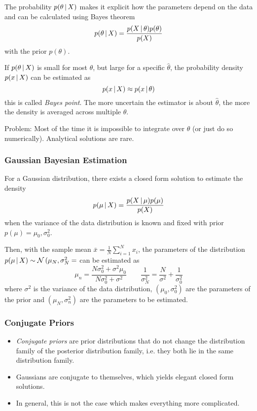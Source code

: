 		The probability \( p(\theta \,\vert\, X) \) makes it explicit how the parameters depend on the data and can be calculated using Bayes theorem
		\begin{equation}
			p(\theta \,\vert\, X) = \frac{p(X \,\vert\, \theta) p(\theta)}{p(X)}
		\end{equation}
		with the prior \( p(\theta) \).

		If \( p(\theta \,\vert\, X) \) is small for most \(\theta\), but large for a specific \( \hat{\theta} \), the probability density \( p(x \,\vert\, X) \) can be estimated as
		\begin{equation}
			p(x \,\vert\, X) \approx p(x \,\vert\, \theta)
		\end{equation}
		this is called \emph{Bayes point}. The more uncertain the estimator is about \( \hat{\theta} \), the more the density is averaged across multiple \(\theta\).

		Problem: Most of the time it is impossible to integrate over \(\theta\) (or just do so numerically). Analytical solutions are rare.

		\subsubsection{Gaussian Bayesian Estimation}
			For a Gaussian distribution, there exists a closed form solution to estimate the density
			\begin{equation}
				p(\mu \,\vert\, X) = \frac{p(X \,\vert\, \mu) p(\mu)}{p(X)}
			\end{equation}
			when the variance of the data distribution is known and fixed with prior \( p(\mu) = \mathcal{\mu_0, \sigma_0^2} \).

			Then, with the sample mean \( \bar{x} = \frac{1}{N} \sum_{i = 1}^{N} x_i \), the parameters of the distribution \( p(\mu \,\vert\, X) \sim \mathcal{N}\,(\mu_N, \sigma_N^2= \) can be estimated as
			\begin{equation}
				\mu_n = \frac{N\sigma_0^2 + \sigma^2 \mu_0}{N\sigma_0^2 + \sigma^2} \qquad \frac{1}{\sigma_N^2} = \frac{N}{\sigma^2} + \frac{1}{\sigma_0^2}
			\end{equation}
			where \(\sigma^2\) is the variance of the data distribution, \( (\mu_0, \sigma_0^2) \) are the parameters of the prior and \( (\mu_N, \sigma_n^2) \) are the parameters to be estimated.

	\subsubsection{Conjugate Priors}
		\begin{itemize}
			\item \emph{Conjugate priors} are prior distributions that do not change the distribution family of the posterior distribution family, i.e. they both lie in the same distribution family.
			\item Gaussians are conjugate to themselves, which yields elegant closed form solutions.
			\item In general, this is not the case which makes everything more complicated.
		\end{itemize}

